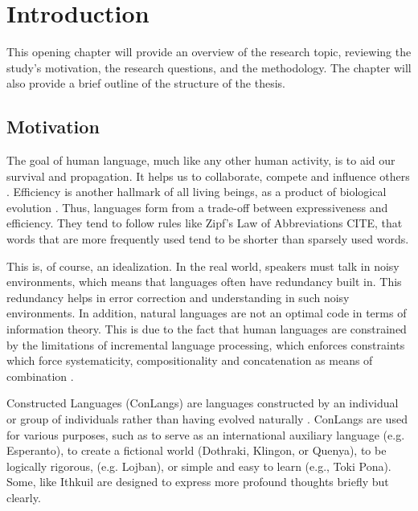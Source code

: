 
\chapter{Introduction}\label{chapter:introduction}

This opening chapter will provide an overview of the research topic, reviewing the study's motivation, the research questions, and the 
methodology. The chapter will also provide a brief outline of the structure of the thesis.

\section{Motivation}

The goal of human language, much like any other human activity, is to aid our survival and propagation. It helps us to collaborate, compete and 
influence others \cite{Levshina_2022}. Efficiency is another hallmark of all living beings, as a product of biological evolution \cite{haCostBenefit2010}. 
Thus, languages form from a trade-off between expressiveness and efficiency. They tend to follow rules like Zipf's Law of Abbreviations CITE, 
that words that are more frequently used tend to be shorter than sparsely used words. 

This is, of course, an idealization. In the real world, speakers must talk in noisy environments, which means that languages often have redundancy
built in. This redundancy helps in error correction and understanding in such noisy environments. In addition, natural languages are not an
optimal code in terms of information theory. This is due to the fact that human languages are constrained by the limitations of incremental
language processing, which enforces constraints which force systematicity, compositionality and concatenation as means of 
combination \cite{futrellInformationTheoryBridge2022}.

Constructed Languages (ConLangs) are languages constructed by an individual or group of individuals rather than having evolved 
naturally \cite{schreyerConstructedLanguages2021}. ConLangs are used for various purposes, such as to serve as an international auxiliary 
language (e.g. Esperanto), to create a fictional world (Dothraki, Klingon, or Quenya), to be logically rigorous, (e.g. Lojban), or simple 
and easy to learn (e.g., Toki Pona). Some, like Ithkuil \cite{Ithkuil2024} are designed to express more profound thoughts briefly but clearly. 

